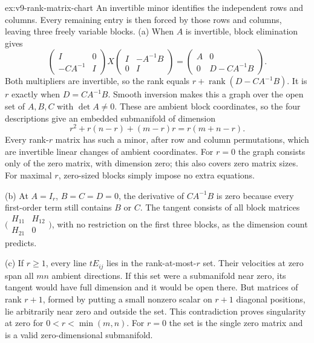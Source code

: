 \begin{solution}{ex:v9-rank-matrix-chart}
\idea An invertible minor identifies the independent rows and columns. Every remaining entry is then forced by those rows and columns, leaving three freely variable blocks.
\writeup (a) When $A$ is invertible, block elimination gives
\[
\begin{pmatrix}I&0\\-CA^{-1}&I\end{pmatrix}
X
\begin{pmatrix}I&-A^{-1}B\\0&I\end{pmatrix}
=\begin{pmatrix}A&0\\0&D-CA^{-1}B\end{pmatrix}.
\]
Both multipliers are invertible, so the rank equals $r+\operatorname{rank}(D-CA^{-1}B)$. It is $r$ exactly when $D=CA^{-1}B$. Smooth inversion makes this a graph over the open set of $A,B,C$ with $\det A\ne0$. These are ambient block coordinates, so the four descriptions give an embedded submanifold of dimension
\[
r^2+r(n-r)+(m-r)r=r(m+n-r).
\]
Every rank-$r$ matrix has such a minor, after row and column permutations, which are invertible linear changes of ambient coordinates. For $r=0$ the graph consists only of the zero matrix, with dimension zero; this also covers zero matrix sizes. For maximal $r$, zero-sized blocks simply impose no extra equations.

(b) At $A=I_r$, $B=C=D=0$, the derivative of $CA^{-1}B$ is zero because every first-order term still contains $B$ or $C$. The tangent consists of all block matrices $\bigl(\begin{smallmatrix}H_{11}&H_{12}\\H_{21}&0\end{smallmatrix}\bigr)$, with no restriction on the first three blocks, as the dimension count predicts.

(c) If $r\ge1$, every line $tE_{ij}$ lies in the rank-at-most-$r$ set. Their velocities at zero span all $mn$ ambient directions. If this set were a submanifold near zero, its tangent would have full dimension and it would be open there. But matrices of rank $r+1$, formed by putting a small nonzero scalar on $r+1$ diagonal positions, lie arbitrarily near zero and outside the set. This contradiction proves singularity at zero for $0<r<\min(m,n)$. For $r=0$ the set is the single zero matrix and is a valid zero-dimensional submanifold.
\end{solution}

